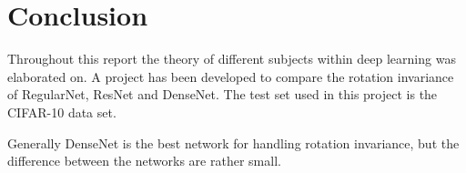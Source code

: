 \chapter{Conclusion}
\label{chp:conc}

Throughout this report the theory of different subjects within deep learning was elaborated on. A project has been developed to compare the rotation invariance of RegularNet, ResNet and DenseNet. The test set used in this project is the CIFAR-10 data set.

Generally DenseNet is the best network for handling rotation invariance, but the difference between the networks are rather small. 